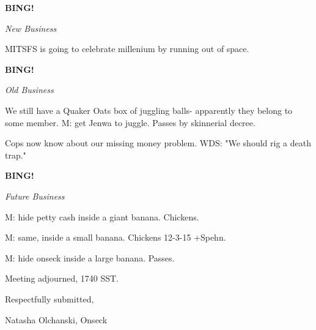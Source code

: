 \documentclass[12pt]{article}
\newcommand{\bing}{{\bf BING!} }
\newcommand{\goto}[1]{\bing \vskip 12pt \centerline{{\em{#1}}}}
\begin{document}
\goto{New Business}

MITSFS is going to celebrate millenium by running out of space.

\goto{Old Business}

We still have a Quaker Oats box of juggling balls- apparently they belong to some member. M: get Jenwa to juggle. Passes by skinnerial decree.

Cops now know about our missing money problem. WDS: "We should rig a death trap."

\goto{Future Business}

M: hide petty cash inside a giant banana. Chickens.

M: same, inside a small banana. Chickens 12-3-15 +Spehn.

M: hide onseck inside a large banana. Passes.

\vspace{12pt}

\noindent
Meeting adjourned, 1740 SST.

\vspace{18pt}

\centerline{Respectfully submitted,}
\centerline{Natasha Olchanski, Onseck}
\end{document}

